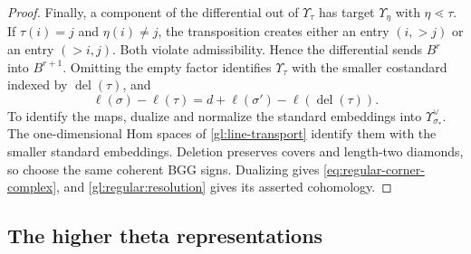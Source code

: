 \documentclass[10pt,a4paper]{article}
\newtheorem{theorem}{Theorem}[section]
\theoremstyle{definition}
\theoremstyle{remark}
\numberwithin{equation}{section}
\newcommand{\fm}{\mathfrak{m}}
\newcommand{\Lrep}{\mathrm{L}}
\begin{document}
\begin{proof}
Finally, a component of the differential out of $\Upsilon_\tau$ has target
$\Upsilon_\eta$ with $\eta\lessdot\tau$. If $\tau(i)=j$ and
$\eta(i)\ne j$, the transposition creates either an entry $(i,>j)$
or an entry $(>i,j)$. Both violate admissibility. Hence the differential
sends $B^r$ into $B^{r+1}$.
Omitting the empty factor identifies $\Upsilon_\tau$ with the smaller
costandard indexed by $\operatorname{del}(\tau)$, and
\[
 \ell(\sigma)-\ell(\tau)
 =d+\ell(\sigma')-\ell(\operatorname{del}(\tau)).
\]
To identify the maps, dualize and normalize the standard embeddings
into $\Upsilon_{\sigma_*}^\vee$. The one-dimensional Hom spaces of
\cref{gl:line-transport} identify them with the smaller standard
embeddings. Deletion preserves covers and length-two diamonds,
so choose the same coherent BGG signs. Dualizing gives
\eqref{eq:regular-corner-complex}, and
\cref{gl:regular:resolution} gives its asserted cohomology.
\end{proof}

\subsection{The higher theta representations}

\end{document}
